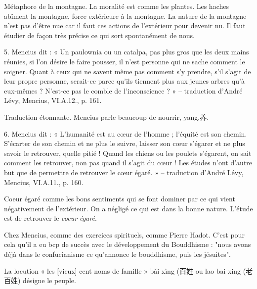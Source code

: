 Métaphore de la montagne. La moralité est comme les plantes. Les haches abîment la montagne, force extérieure à la montagne. La nature de la montagne n'est pas d'être nue car il faut ces actions de l'extérieur pour devenir nu. Il faut étudier de façon très précise ce qui sort spontanément de nous. 

\begin{singlequote}
    5.	Mencius dit : « Un paulownia ou un catalpa, pas plus gros que les deux mains réunies, si l’on désire le faire pousser, il n’est personne qui ne sache comment le soigner. Quant à ceux qui ne savent même pas comment s’y prendre, s’il s’agit de leur propre personne, serait-ce parce qu’ils tiennent plus aux jeunes arbres qu’à eux-mêmes ? N’est-ce pas le comble de l’inconscience ? »
-- traduction d’André Lévy, Mencius, VI.A.12., p. 161.
\end{singlequote}
Traduction étonnante. Mencius parle beaucoup de nourrir, yang,养. 




\begin{singlequote}
    6.	Mencius dit : « L’humanité est au cœur de l’homme ; l’équité est son chemin. S’écarter de son chemin et ne plus le suivre, laisser son cœur s’égarer et ne plus savoir le retrouver, quelle pitié ! Quand les chiens ou les poulets s’égarent, on sait comment les retrouver, non pas quand il s’agit du cœur !
Les études n’ont d’autre but que de permettre de retrouver le cœur égaré. »
-- traduction d’André Lévy, Mencius, VI.A.11., p. 160.
\end{singlequote}

Coeur égaré comme les bons sentiments qui se font dominer par ce qui vient négativement de l'extérieur. On a négligé ce qui est dans la bonne nature. L'étude est de retrouver le \textit{coeur égaré}.

\begin{Synthesis}
    Chez Mencius, comme des exercices spirituels, comme Pierre Hadot.
    C'est pour cela qu'il a eu bcp de succès avec le développement du Bouddhisme : "nous avons déjà dans le confucianisme ce qu'annonce le bouddhisme, puis les jésuites".
\end{Synthesis}

La locution « les [vieux] cent noms de famille » bǎi xìng (百姓 ou lao bai xing (老百姓) désigne le peuple.  


